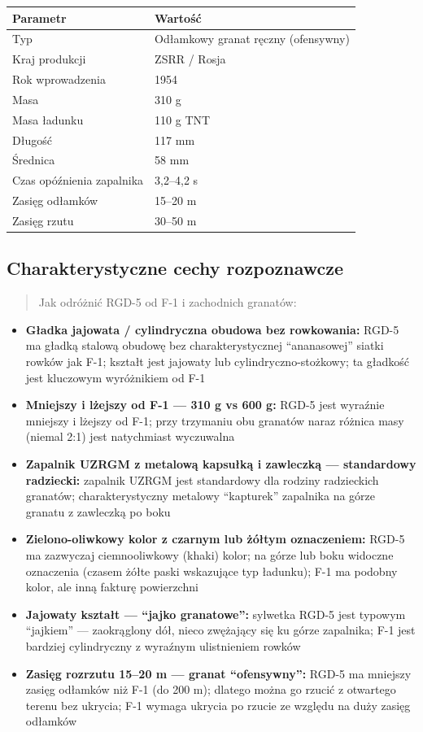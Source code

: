 \documentclass[12pt,oneside]{book}
\providecommand{\tightlist}{%
  \setlength{\itemsep}{0pt}\setlength{\parskip}{0pt}}
\begin{document}
\begin{longtable}[]{@{}ll@{}}
\toprule\noalign{}
Parametr & Wartość \\
\midrule\noalign{}
\endhead
\bottomrule\noalign{}
\endlastfoot
Typ & Odłamkowy granat ręczny (ofensywny) \\
Kraj produkcji & ZSRR / Rosja \\
Rok wprowadzenia & 1954 \\
Masa & 310 g \\
Masa ładunku & 110 g TNT \\
Długość & 117 mm \\
Średnica & 58 mm \\
Czas opóźnienia zapalnika & 3,2--4,2 s \\
Zasięg odłamków & 15--20 m \\
Zasięg rzutu & 30--50 m \\
\end{longtable}

\subsection{Charakterystyczne cechy
rozpoznawcze}\label{charakterystyczne-cechy-rozpoznawcze-117}

\begin{quote}
Jak odróżnić RGD-5 od F-1 i zachodnich granatów:
\end{quote}

\begin{itemize}
\tightlist
\item
  \textbf{Gładka jajowata / cylindryczna obudowa bez rowkowania:} RGD-5
  ma gładką stalową obudowę bez charakterystycznej ``ananasowej'' siatki
  rowków jak F-1; kształt jest jajowaty lub cylindryczno-stożkowy; ta
  gładkość jest kluczowym wyróżnikiem od F-1
\item
  \textbf{Mniejszy i lżejszy od F-1 --- 310 g vs 600 g:} RGD-5 jest
  wyraźnie mniejszy i lżejszy od F-1; przy trzymaniu obu granatów naraz
  różnica masy (niemal 2:1) jest natychmiast wyczuwalna
\item
  \textbf{Zapalnik UZRGM z metalową kapsułką i zawleczką --- standardowy
  radziecki:} zapalnik UZRGM jest standardowy dla rodziny radzieckich
  granatów; charakterystyczny metalowy ``kapturek'' zapalnika na górze
  granatu z zawleczką po boku
\item
  \textbf{Zielono-oliwkowy kolor z czarnym lub żółtym oznaczeniem:}
  RGD-5 ma zazwyczaj ciemnooliwkowy (khaki) kolor; na górze lub boku
  widoczne oznaczenia (czasem żółte paski wskazujące typ ładunku); F-1
  ma podobny kolor, ale inną fakturę powierzchni
\item
  \textbf{Jajowaty kształt --- ``jajko granatowe'':} sylwetka RGD-5 jest
  typowym ``jajkiem'' --- zaokrąglony dół, nieco zwężający się ku górze
  zapalnika; F-1 jest bardziej cylindryczny z wyraźnym ulistnieniem
  rowków
\item
  \textbf{Zasięg rozrzutu 15--20 m --- granat ``ofensywny'':} RGD-5 ma
  mniejszy zasięg odłamków niż F-1 (do 200 m); dlatego można go rzucić z
  otwartego terenu bez ukrycia; F-1 wymaga ukrycia po rzucie ze względu
  na duży zasięg odłamków
\end{itemize}
\end{document}
